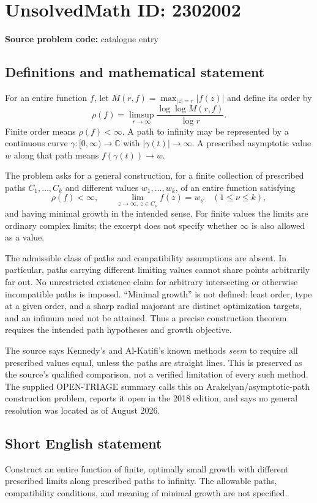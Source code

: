 \documentclass[11pt]{article}
\newcommand{\C}{\mathbb{C}}
\begin{document}
\section*{UnsolvedMath ID: 2302002}
\textbf{Source problem code:} catalogue entry
\subsection{Definitions and mathematical statement}
For an entire function \(f\), let \(M(r,f)=\max_{|z|=r}|f(z)|\) and define its order by
\[
\rho(f)=\limsup_{r\to\infty}\frac{\log\log M(r,f)}{\log r}.
\]
Finite order means \(\rho(f)<\infty\). A path to infinity may be represented by a continuous curve \(\gamma:[0,\infty)\to\C\) with \(|\gamma(t)|\to\infty\). A prescribed asymptotic value \(w\) along that path means \(f(\gamma(t))\to w\).

The problem asks for a general construction, for a finite collection of prescribed paths \(C_1,\ldots,C_k\) and different values \(w_1,\ldots,w_k\), of an entire function satisfying
\[
\rho(f)<\infty,\qquad
\lim_{z\to\infty,\ z\in C_\nu}f(z)=w_\nu
\quad(1\le\nu\le k),
\]
and having minimal growth in the intended sense. For finite values the limits are ordinary complex limits; the excerpt does not specify whether \(\infty\) is also allowed as a value.

The admissible class of paths and compatibility assumptions are absent. In particular, paths carrying different limiting values cannot share points arbitrarily far out. No unrestricted existence claim for arbitrary intersecting or otherwise incompatible paths is imposed. ``Minimal growth'' is not defined: least order, type at a given order, and a sharp radial majorant are distinct optimization targets, and an infimum need not be attained. Thus a precise construction theorem requires the intended path hypotheses and growth objective.

The source says Kennedy's and Al-Katifi's known methods \emph{seem} to require all prescribed values equal, unless the paths are straight lines. This is preserved as the source's qualified comparison, not a verified limitation of every such method. The supplied OPEN-TRIAGE summary calls this an Arakelyan/asymptotic-path construction problem, reports it open in the 2018 edition, and says no general resolution was located as of August 2026.
\subsection{Short English statement}
Construct an entire function of finite, optimally small growth with different prescribed limits along prescribed paths to infinity. The allowable paths, compatibility conditions, and meaning of minimal growth are not specified.
\end{document}
